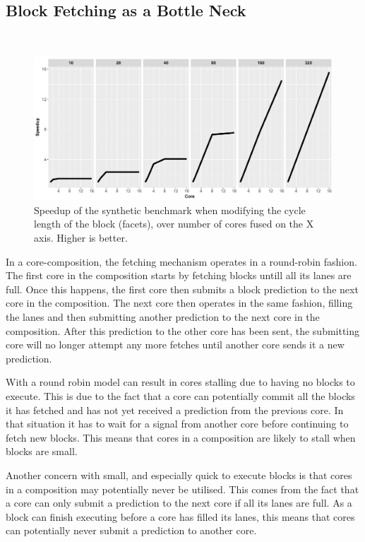 \subsection{Block Fetching as a Bottle Neck}~\label{ch3:sec:bfn}

\begin{figure}[h]
    \centering
    \includegraphics[width=1\textwidth]{chapter3/graphics/motivation_standard_fetch.pdf}

    \caption{Speedup of the synthetic benchmark when modifying the cycle length of the block (facets), over number of cores fused on the X axis. Higher is better.}
    \label{fig:block_graph}
\end{figure}

In a core-composition, the fetching mechanism operates in a round-robin fashion.
The first core in the composition starts by fetching blocks untill all its lanes are full.
Once this happens, the first core then submits a block prediction to the next core in the composition.
The next core then operates in the same fashion, filling the lanes and then submitting another prediction to the next core in the composition.
After this prediction to the other core has been sent, the submitting core will no longer attempt any more fetches until another core sends it a new prediction.

With a round robin model can result in cores stalling due to having no blocks to execute.
This is due to the fact that a core can potentially commit all the blocks it has fetched and has not yet received a prediction from the previous core.
In that situation it has to wait for a signal from another core before continuing to fetch new blocks.
This means that cores in a composition are likely to stall when blocks are small.

Another concern with small, and especially quick to execute blocks is that cores in a composition may potentially never be utilised.
This comes from the fact that a core can only submit a prediction to the next core if all its lanes are full.
As a block can finish executing before a core has filled its lanes, this means that cores can potentially never submit a prediction to another core.

